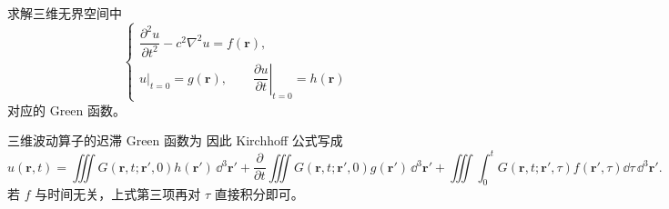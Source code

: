 \begin{question}

求解三维无界空间中
\[
\begin{cases}
\dfrac{\partial^2u}{\partial t^2}-c^2\nabla^2u=f(\mathbf r),\\
u|_{t=0}=g(\mathbf r),\qquad \left.\dfrac{\partial u}{\partial t}\right|_{t=0}=h(\mathbf r)
\end{cases}
\]
对应的 Green 函数。

\begin{solution}

三维波动算子的迟滞 Green 函数为
因此 Kirchhoff 公式写成
\[
 u(\mathbf r,t)=
 \iiint G(\mathbf r,t;\mathbf r',0)h(\mathbf r')\,\dd{^3\mathbf r'}
 +\frac{\partial}{\partial t}\iiint G(\mathbf r,t;\mathbf r',0)g(\mathbf r')\,\dd{^3\mathbf r'}
 +\iiint\!\int_0^t G(\mathbf r,t;\mathbf r',\tau)f(\mathbf r',\tau)\dd{\tau}\,\dd{^3\mathbf r'}.
\]
若 $f$ 与时间无关，上式第三项再对 $\tau$ 直接积分即可。

\end{solution}
\end{question}

\clearpage

